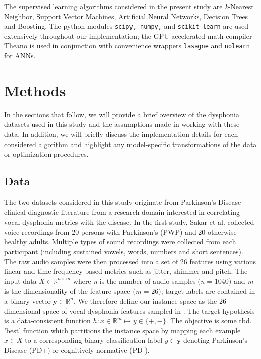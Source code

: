 \documentclass[12pt]{article}
\begin{document}
The supervised learning algorithms considered in the present study are \textit{k}-Nearest Neighbor, Support Vector Machines, Artificial Neural Networks, Decision Trees and Boosting. The python modules \texttt{scipy, numpy,} and \texttt{scikit-learn} \cite{scipy} \cite{scikit-learn} are used extensively  throughout our implementation; the GPU-accelerated math compiler Theano \cite{bergstra+al:2010-scipy} is used in conjunction with convenience wrappers \texttt{lasagne} and \texttt{nolearn} for ANNs.

\section{Methods}
\label{sec:meth}
In the sections that follow, we will provide a brief overview of the dysphonia datasets used in this study and the assumptions made in working with these data. In addition, we will briefly discuss the implementation details for each considered algorithm and highlight any model-specific transformations of the data or optimization procedures.

\subsection{Data}
The two datasets considered in this study originate from Parkinson's Disease clinical diagnostic literature from a research domain interested in correlating vocal dysphonia metrics with the disease. In the first study, Sakar et al.\cite{Sakar2013} collected voice recordings from 20 persons with Parkinson's (PWP) and 20 otherwise healthy adults. Multiple types of sound recordings were collected from each participant (including sustained vowels, words, numbers and short sentences). The raw audio samples were then processed into a set of 26 features using various linear and time-frequency based metrics such as jitter, shimmer and pitch. The input data $X \in \mathbb{R}^{n \times m} $ where \textit{n} is the number of audio samples (\textit{n} = 1040) and \textit{m} is the dimensionality of the feature space (\textit{m} = 26); target labels are contained in a binary vector $ \boldsymbol{y} \in \mathbb{R}^n $. We therefore define our instance space as the 26 dimensional space of vocal dysphonia features sampled in \cite{Sakar2013}. The target hypothesis is a data-consistent function $ h : x \in \mathbb{R}^m \mapsto y \in \lbrace +,- \rbrace $. The objective is some tbd. 'best' function which partitions the instance space by mapping each example $ x \in X $ to a corresponding binary classification label $ y \in \boldsymbol{y} $ denoting Parkinson's Disease (PD+) or cognitively normative (PD-).
\end{document}
